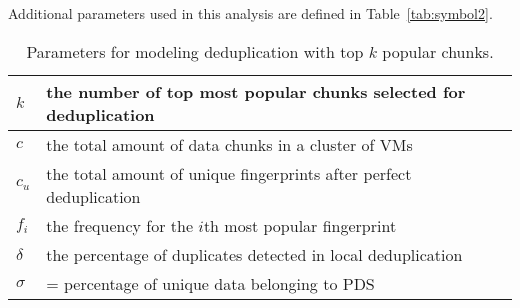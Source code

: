Additional parameters used in this analysis are defined in Table~\ref{tab:symbol2}. 

\begin{table}[htbp]
\small
\centering
\begin{tabular}{|p{1.0cm}|p{5.75cm}|}
\hline
$k$ &  the number of top most popular chunks selected for deduplication\\ 
\hline
$c$ &  the total amount of data chunks in a cluster of VMs\\ 
\hline
$c_u$ &  the total amount of unique fingerprints after perfect  deduplication\\
\hline
$f_i$ &  the frequency for the $i$th most popular fingerprint\\
\hline
$\delta$ &  the percentage of duplicates detected in local deduplication\\
\hline
$\sigma$ & = percentage of unique data  belonging to  PDS\\
\hline
\hline
\end{tabular}
\caption{Parameters for modeling deduplication with top $k$ popular chunks.}
\label{tab:symbol}
\end{table}


